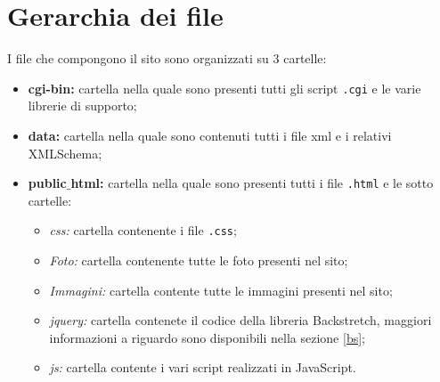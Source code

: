 \section{Gerarchia dei file}
I file che compongono il sito sono organizzati su 3 cartelle:
\begin{itemize}
\item \textbf{cgi-bin:} cartella nella quale sono presenti tutti gli script \texttt{.cgi} e le varie librerie di supporto;
\item \textbf{data:} cartella nella quale sono contenuti tutti i file xml e i relativi XMLSchema;
\item \textbf{public$\_$html:} cartella nella quale sono presenti tutti i file \texttt{.html} e le sotto cartelle:
\begin{itemize}
\item \textit{css:} cartella contenente i file \texttt{.css};
\item \textit{Foto:} cartella contenente tutte le foto presenti nel sito;
\item \textit{Immagini:} cartella contente tutte le immagini presenti nel sito;
\item \textit{jquery:} cartella contenete il codice della libreria Backstretch, maggiori informazioni a riguardo sono disponibili nella sezione \ref{bs};
\item \textit{js:} cartella contente i vari script realizzati in JavaScript.
\end{itemize}

\end{itemize}


